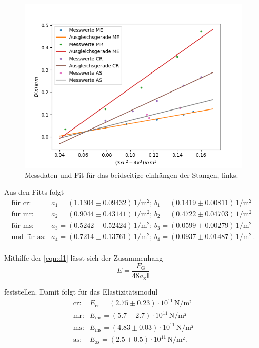 \begin{figure}[H]
	\centering
	\includegraphics{Daten/AS2_l.png}
	\caption{Messdaten und Fit für das beidseitige einhängen der Stangen, links.}
	\label{fig:links}
\end{figure}

\noindent
Aus den Fitts folgt
\begin{align*}
    \text{für cr}:& a_1 = (1.1304 \pm 0.09432) \, \si{1\per\meter^2} ; \, b_1 = (0.1419 \pm 0.00811) \, \si{1\per\meter^2}  \\
    \text{für mr}:& a_2 = (0.9044 \pm 0.43141) \, \si{1\per\meter^2} ; \, b_2 = (0.4722 \pm 0.04703) \, \si{1\per\meter^2} \\
    \text{für ms}:& a_3 = (0.5242 \pm 0.52424) \, \si{1\per\meter^2} ; \, b_3 = (0.0599 \pm 0.00279) \, \si{1\per\meter^2}\\
\text{und für as}:& a_4 = (0.7214 \pm 0.13761) \, \si{1\per\meter^2} ;\,  b_4 = (0.0937 \pm 0.01487) \, \si{1\per\meter^2} \, .\\
\end{align*} 

\noindent
Mithilfe der \autoref{eqn:d1} lässt sich der Zusammenhang 
\begin{equation*}
    E = \frac{F_\text{G}}{48a_\text{x}\symbf{I}}
\end{equation*}

\noindent
feststellen. Damit folgt für das Elastizitätsmodul%
\begin{align*}
    \text{cr}:& E_\text{cr} = (2.75 \pm 0.23) \cdot 10^{11}   \, \si{\newton\per\meter²}\\
    \text{mr}:& E_\text{mr} = (5.7 \pm 2.7) \cdot 10^{11} \, \si{\newton\per\meter²}\\
    \text{ms}:& E_\text{ms} = (4.83 \pm 0.03) \cdot 10^{11} \, \si{\newton\per\meter²} \\
    \text{as}:& E_\text{as} = (2.5\pm 0.5) \cdot 10^{11} \, \si{\newton\per\meter²} \, .\\
\end{align*} 

